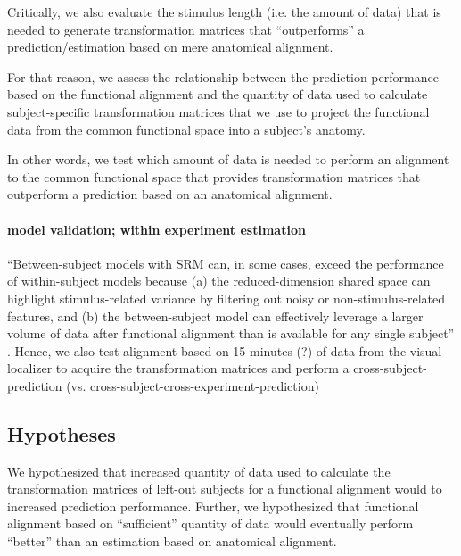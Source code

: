
%
Critically, we also evaluate the stimulus length (i.e. the amount of data) that
is needed to generate transformation matrices that ``outperforms'' a
prediction/estimation based on mere anatomical alignment.

For that reason, we assess the relationship between the prediction performance
based on the functional alignment and the quantity of data used to calculate
subject-specific transformation matrices that we use to project the functional
data from the common functional space into a subject's anatomy.

In other words, we test which amount of data is needed to perform an alignment
to the common functional space that provides transformation matrices that
outperform a prediction based on an anatomical alignment.


\paragraph{model validation; within experiment estimation}


%
``Between-subject models with SRM can, in some cases, exceed the performance of
within-subject models because (a) the reduced-dimension shared space can
highlight stimulus-related variance by filtering out noisy or
non-stimulus-related features, and (b) the between-subject model can effectively
leverage a larger volume of data after functional alignment than is available
for any single subject'' \citep{kumar2020brainiak}.
%
Hence, we also test alignment based on 15 minutes (?) of data from the visual
localizer to acquire the transformation matrices and perform a
cross-subject-prediction (vs. cross-subject-cross-experiment-prediction)


\subsection{Hypotheses}


%
We hypothesized that increased quantity of data used to calculate the
transformation matrices of left-out subjects for a functional alignment would to
increased prediction performance.
%
Further, we hypothesized that functional alignment based on ``sufficient''
quantity of data would eventually perform ``better'' than an estimation based on
anatomical alignment.


